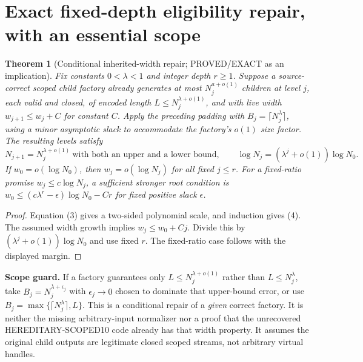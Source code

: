\documentclass[11pt]{article}
\newtheorem{theorem}{Theorem}
\begin{document}
\section{Exact fixed-depth eligibility repair, with an essential scope}
\begin{theorem}[Conditional inherited-width repair; PROVED/EXACT as an implication]
Fix constants $0<\lambda<1$ and integer depth $r\ge1$.
Suppose a \emph{source-correct} scoped child factory already
generates at most $N_j^{a+o(1)}$ children at level $j$,
each valid and closed, of encoded length
$L\le N_j^{\lambda+o(1)}$, and with live width
$w_{j+1}\le w_j+C$ for constant $C$.
Apply the preceding padding with $B_j=\lceil N_j^\lambda\rceil$,
using a minor asymptotic slack to accommodate the factory's
$o(1)$ size factor. The resulting levels satisfy
\[
 N_{j+1}=N_j^{\lambda+o(1)}\ \text{with both an
 upper and a lower bound},\qquad
 \log N_j=(\lambda^j+o(1))\log N_0.\tag{4}
\]
If $w_0=o(\log N_0)$, then $w_j=o(\log N_j)$
for all fixed $j\le r$.
For a fixed-ratio promise $w_j\le c\log N_j$, a
sufficient stronger root condition is
$w_0\le(c\lambda^r-\epsilon)\log N_0-Cr$
for fixed positive slack $\epsilon$.
\end{theorem}
\begin{proof}
Equation (3) gives a two-sided polynomial scale,
and induction gives (4). The assumed width growth
implies $w_j\le w_0+Cj$. Divide this by
$(\lambda^j+o(1))\log N_0$ and use fixed $r$.
The fixed-ratio case follows with the displayed margin.
\end{proof}
\noindent\textbf{Scope guard.}
If a factory guarantees only $L\le N_j^{\lambda+o(1)}$
rather than $L\le N_j^\lambda$, take
$B_j=N_j^{\lambda+\epsilon_j}$ with
$\epsilon_j\to0$ chosen to dominate that upper-bound
error, or use $B_j=\max\{\lceil N_j^\lambda\rceil,L\}$.
This is a conditional repair of a \emph{given} correct
factory. It is neither the missing arbitrary-input
normalizer nor a proof that the unrecovered
HEREDITARY-SCOPED10 code already has that width property.
It assumes the original child outputs are legitimate
closed scoped streams, not arbitrary virtual handles.
\end{document}
